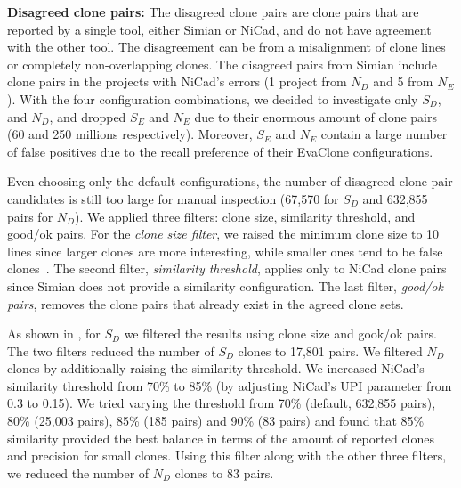 \documentclass[sigconf,review, anonymous]{acmart}
\begin{document}
\textbf{Disagreed clone pairs: }
The disagreed clone pairs are clone pairs that are reported by a
single tool, either Simian or NiCad, and do not have agreement with
the other tool. The disagreement can be from a misalignment of clone
lines or completely non-overlapping clones. The disagreed pairs from
Simian include clone pairs in the projects with NiCad's errors (1
project from $N_D$ and 5 from $N_E$).  With the four configuration
combinations, we decided to investigate only $S_D$, and $N_D$, and
dropped $S_E$ and $N_E$ due to their enormous amount of clone pairs
(60 and 250 millions respectively). Moreover, $S_E$ and $N_E$ contain
a large number of false positives due to the recall preference of
their EvaClone configurations.

Even choosing only the default configurations, the number of disagreed
clone pair candidates is still too large for manual inspection (67,570
for $S_D$ and 632,855 pairs for $N_D$). We applied three filters: clone
size, similarity threshold, and good/ok pairs. For
the \emph{clone size filter}, we raised the minimum clone size to 10 lines
since larger clones are more interesting, while smaller ones tend to
be false clones~\cite{Saini2016}.
The second filter, \emph{similarity threshold}, applies
only to NiCad clone pairs since Simian does not provide a similarity
configuration. The last filter, \emph{good/ok pairs}, removes the
clone pairs that already exist in the agreed clone sets.

As shown in , for $S_D$ we filtered the
results using clone size and gook/ok pairs. The
two filters reduced the number of $S_D$ clones to 17,801 pairs. We
filtered $N_D$ clones by additionally raising the similarity
threshold. We increased NiCad's similarity threshold from 70\% to 85\%
(by adjusting NiCad's $\mathrm{UPI}$ parameter from 0.3 to 0.15). We
tried varying the threshold from 70\% (default, 632,855 pairs), 80\%
(25,003 pairs), 85\% (185 pairs) and 90\% (83 pairs) and found that
85\% similarity provided the best balance in terms of the amount of
reported clones and precision for small clones. Using this filter
along with the other three filters, we reduced the number of $N_D$
clones to 83 pairs.
\end{document}
